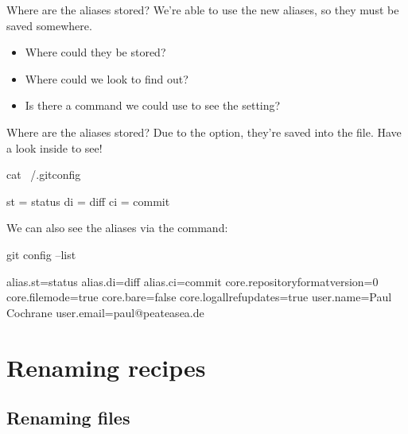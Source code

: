 \documentclass{git_course}
\begin{document}
\begin{frame}[fragile]{Where are the aliases stored?}
    We're able to use the new aliases, so they must be saved somewhere.
    \begin{itemize}
        \item Where could they be stored?
        \item Where could we look to find out?
        \item Is there a command we could use to see the setting?
    \end{itemize}
\end{frame}

\begin{frame}[fragile]{Where are the aliases stored?}
    Due to the  option, they're saved into the
     file.  Have a look inside to see!
    \begin{shellcode}
        cat ~/.gitconfig
    \end{shellcode}
    \begin{outputcode}
        [alias]
                st = status
                di = diff
                ci = commit
    \end{outputcode}

    We can also see the aliases via the  command:
    \begin{shellcode}
        git config --list
    \end{shellcode}
    \begin{outputcode}
        alias.st=status
        alias.di=diff
        alias.ci=commit
        core.repositoryformatversion=0
        core.filemode=true
        core.bare=false
        core.logallrefupdates=true
        user.name=Paul Cochrane
        user.email=paul@peateasea.de
    \end{outputcode}
\end{frame}

\section{Renaming recipes}

\subsection{Renaming files}
\end{document}
